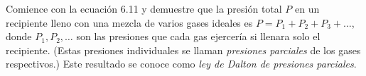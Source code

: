 \item Comience con la ecuación 6.11 y demuestre que la presión total $P$ en un recipiente lleno con una mezcla de varios gases ideales es $P = P_1 + P_2 + P_3 + \dots$, donde $P_1, P_2, \dots$ son las presiones que cada gas ejercería si llenara solo el recipiente. (Estas presiones individuales se llaman \textit{presiones parciales} de los gases respectivos.) Este resultado se conoce como \textit{ley de Dalton de presiones parciales}.
